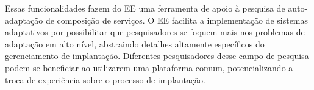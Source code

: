 \begin{description}
Essas funcionalidades fazem do EE uma ferramenta de apoio 
à pesquisa de auto-adaptação de composição de serviços.
O EE facilita a implementação de sistemas adaptativos
por possibilitar que pesquisadores se foquem mais nos problemas de adaptação em
alto nível, abstraindo detalhes altamente específicos do gerenciamento de implantação.
Diferentes pesquisadores desse campo de pesquisa podem se beneficiar ao utilizarem uma plataforma comum,
potencializando a troca de experiência sobre o processo de implantação. 


\end{description}

